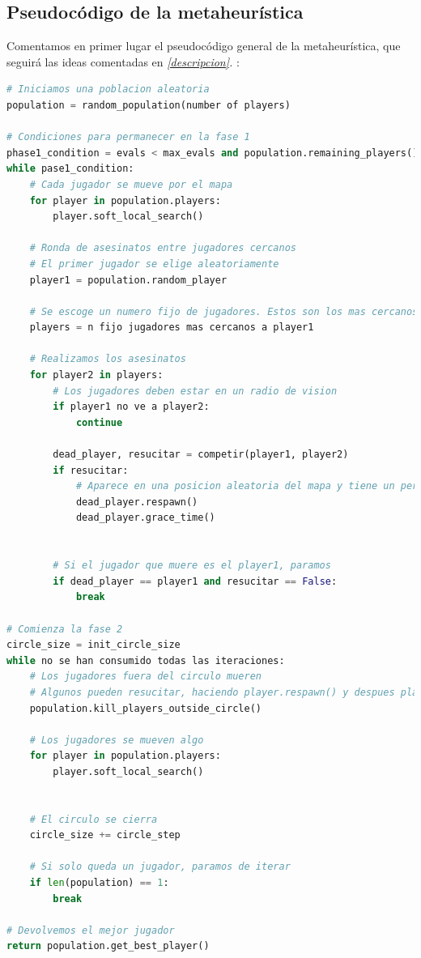 \documentclass[11pt]{article}
\begin{document}
\subsection{Pseudocódigo de la metaheurística}

Comentamos en primer lugar el pseudocódigo general de la metaheurística, que seguirá las ideas comentadas en \emph{\ref{descripcion}. }:

\begin{lstlisting}[language = python]
# Iniciamos una poblacion aleatoria
population = random_population(number of players)

# Condiciones para permanecer en la fase 1
phase1_condition = evals < max_evals and population.remaining_players() >= phase1_players_percentage
while pase1_condition:
    # Cada jugador se mueve por el mapa
    for player in population.players:
        player.soft_local_search()

    # Ronda de asesinatos entre jugadores cercanos
    # El primer jugador se elige aleatoriamente
    player1 = population.random_player

    # Se escoge un numero fijo de jugadores. Estos son los mas cercanos al player1
    players = n fijo jugadores mas cercanos a player1

    # Realizamos los asesinatos
    for player2 in players:
        # Los jugadores deben estar en un radio de vision
        if player1 no ve a player2:
            continue

        dead_player, resucitar = competir(player1, player2)
        if resucitar:
            # Aparece en una posicion aleatoria del mapa y tiene un periodo de gracia
            dead_player.respawn()
            dead_player.grace_time()


        # Si el jugador que muere es el player1, paramos
        if dead_player == player1 and resucitar == False:
            break

# Comienza la fase 2
circle_size = init_circle_size
while no se han consumido todas las iteraciones:
    # Los jugadores fuera del circulo mueren
    # Algunos pueden resucitar, haciendo player.respawn() y despues player.grace_time()
    population.kill_players_outside_circle()

    # Los jugadores se mueven algo
    for player in population.players:
        player.soft_local_search()


    # El circulo se cierra
    circle_size += circle_step

    # Si solo queda un jugador, paramos de iterar
    if len(population) == 1:
        break

# Devolvemos el mejor jugador
return population.get_best_player()
\end{lstlisting}
\end{document}

